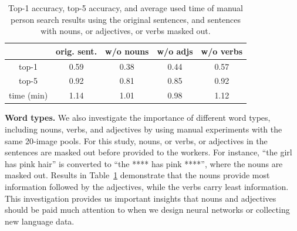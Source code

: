 \setlength{\tabcolsep}{7pt}
\begin{table}[t]
\begin{center}
\begin{tabular}{c|c|c|c|c}
\hline

\hline
\cline{2-4}
& orig. sent. & w/o nouns & w/o adjs & w/o verbs \\
\hline

\hline\noalign{\smallskip}\hline

\hline
top-1 			& 0.59 	& 0.38 	& 0.44 	& 0.57 \\
\hline
top-5  			& 0.92  & 0.81 	& 0.85 	& 0.92 \\
\hline
time (min)  	& 1.14  & 1.01  & 0.98  & 1.12\\
\hline

\hline
\end{tabular}
\end{center}
\vspace{-5pt}
\caption{Top-1 accuracy, top-5 accuracy, and average used time of manual person search results using the original sentences, and sentences with nouns, or adjectives, or verbs masked out.}
\label{tab:nouns}
\vspace{-5pt}
\end{table}

\textbf{Word types.} We also investigate the importance of different word types, including nouns, verbs, and adjectives by using manual experiments with the same 20-image pools. For this study, nouns, or verbs, or adjectives in the sentences are masked out before provided to the workers. For instance, ``the girl has pink hair'' is converted to ``the **** has pink ****'', where the nouns are masked out. Results in Table~\ref{tab:nouns} demonstrate that the nouns provide most information followed by the adjectives, while the verbs carry least information. This investigation provides us important insights that nouns and adjectives should be paid much attention to when we design neural networks or collecting new language data.

